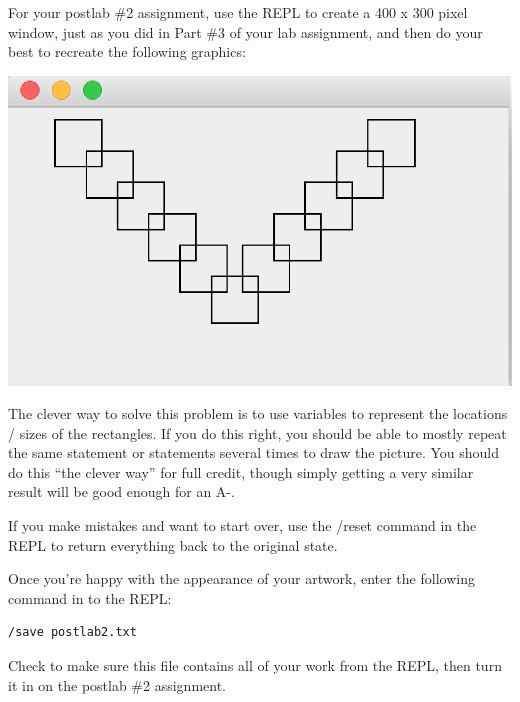 For your postlab \#2 assignment, use the REPL to create a 400 x 300 pixel window, just as you did in Part \#3 of your lab assignment, and then do your best to recreate the following graphics:

\includegraphics[scale=1]{lab2ss.eps} 

The clever way to solve this problem is to use variables to represent the locations / sizes of the rectangles. If you do this right, you should be able to mostly repeat the same statement or statements several times to draw the picture. You should do this ``the clever way'' for full credit, though simply getting a very similar result will be good enough for an A-. 

If you make mistakes and want to start over, use the /reset command in the REPL to return everything back to the original state. 

Once you're happy with the appearance of your artwork, enter the following command in to the REPL:

\begin{verbatim}
/save postlab2.txt
\end{verbatim}

Check to make sure this file contains all of your work from the REPL, then 
turn it in on the postlab \#2 assignment. 
